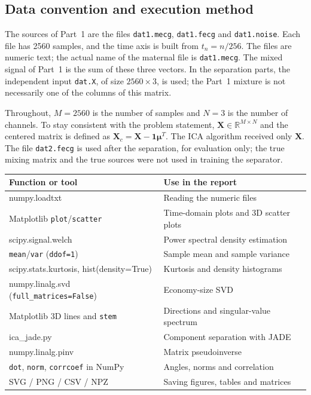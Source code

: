 \subsection*{Data convention and execution method}

The sources of Part~1 are the files \texttt{dat1.mecg}, \texttt{dat1.fecg} and \texttt{dat1.noise}. Each file has 2560 samples, and the time axis is built from $t_n = n/256$. The files are numeric text; the actual name of the maternal file is \texttt{dat1.mecg}. The mixed signal of Part~1 is the sum of these three vectors. In the separation parts, the independent input \texttt{dat.X}, of size $2560\times 3$, is used; the Part~1 mixture is not necessarily one of the columns of this matrix.

Throughout, $M = 2560$ is the number of samples and $N = 3$ is the number of channels. To stay consistent with the problem statement, $\mathbf{X}\in\mathbb{R}^{M\times N}$ and the centered matrix is defined as $\mathbf{X}_c = \mathbf{X} - \mathbf{1}\bm{\mu}^{T}$. The ICA algorithm received only $\mathbf{X}$. The file \texttt{dat2.fecg} is used after the separation, for evaluation only; the true mixing matrix and the true sources were not used in training the separator.

\begin{center}
\begin{tabularx}{\textwidth}{@{}>{\ttfamily\raggedright}p{5.2cm}X@{}}
\toprule
\textnormal{\textbf{Function or tool}} & \textbf{Use in the report}\\
\midrule
numpy.loadtxt & Reading the numeric files\\
Matplotlib \texttt{plot}/\texttt{scatter} & Time-domain plots and 3D scatter plots\\
scipy.signal.welch & Power spectral density estimation\\
\texttt{mean}/\texttt{var} (\texttt{ddof=1}) & Sample mean and sample variance\\
scipy.stats.kurtosis, hist(density=True) & Kurtosis and density histograms\\
numpy.linalg.svd (\texttt{full\_matrices=False}) & Economy-size SVD\\
Matplotlib 3D lines and \texttt{stem} & Directions and singular-value spectrum\\
ica\_jade.py & Component separation with JADE\\
numpy.linalg.pinv & Matrix pseudoinverse\\
\texttt{dot}, \texttt{norm}, \texttt{corrcoef} in NumPy & Angles, norms and correlation\\
SVG / PNG / CSV / NPZ & Saving figures, tables and matrices\\
\bottomrule
\end{tabularx}
\end{center}

